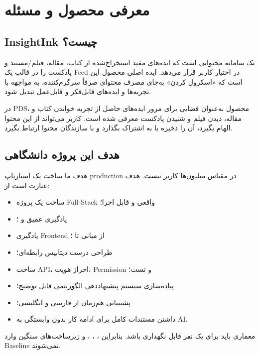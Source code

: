 
\chapter{معرفی محصول و مسئله}

\section{InsightInk چیست؟}

 یک سامانه محتوایی است که ایده‌های مفید استخراج‌شده از کتاب، مقاله، فیلم/مستند و پادکست را در قالب یک Feed در اختیار کاربر قرار می‌دهد. ایده اصلی محصول این است که «اسکرول کردن» به‌جای مصرف محتوای صرفاً سرگرم‌کننده، به مواجهه با تجربه‌ها و ایده‌های قابل‌فکر و قابل‌عمل تبدیل شود.

\begin{sourcebox}
در PDS، محصول به‌عنوان فضایی برای مرور ایده‌های حاصل از تجربه خواندن کتاب و مقاله، دیدن فیلم و شنیدن پادکست معرفی شده است. کاربر می‌تواند از این محتوا الهام بگیرد، آن را ذخیره یا به اشتراک بگذارد و با سازندگان محتوا ارتباط بگیرد.
\end{sourcebox}

\section{هدف این پروژه دانشگاهی}

هدف ما ساخت یک استارتاپ production در مقیاس میلیون‌ها کاربر نیست. هدف عبارت است از:

\begin{itemize}
  \item ساخت یک پروژه Full-Stack واقعی و قابل اجرا؛
  \item یادگیری عمیق  و ؛
  \item یادگیری Frontend از مبانی تا ؛
  \item طراحی درست دیتابیس رابطه‌ای؛
  \item ساخت API، احراز هویت، Permission و تست؛
  \item پیاده‌سازی سیستم پیشنهاددهی الگوریتمی قابل توضیح؛
  \item پشتیبانی هم‌زمان از فارسی و انگلیسی؛
  \item داشتن مستندات کامل برای ادامه کار بدون وابستگی به AI.
\end{itemize}

\begin{decisionbox}
معماری باید برای یک نفر قابل نگهداری باشد. بنابراین ، ، ،  و زیرساخت‌های سنگین وارد Baseline نمی‌شوند.
\end{decisionbox}

